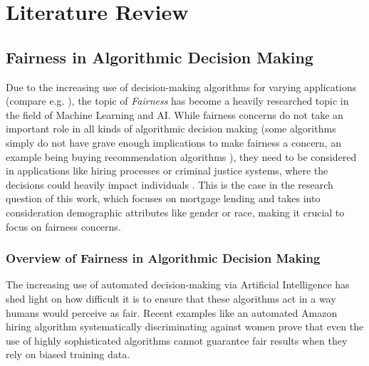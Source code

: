 \chapter{Literature Review}\label{chap:lit}

\section{Fairness in Algorithmic Decision Making}\label{sec:fairness}

Due to the increasing use of decision-making algorithms for varying applications (compare e.g. \cite{Mehrabi2021}), the topic of \textit{Fairness} has become a heavily researched topic in the field of Machine Learning and AI.\@
While fairness concerns do not take an important role in all kinds of algorithmic decision making (some algorithms simply do not have grave enough implications to make fairness a concern, an example being buying recommendation algorithms \parencite{Marcinkevics2023}), 
they need to be considered in applications like hiring processes or criminal justice systems, where the decisions could heavily impact individuals \parencite{Barocas2016}.
This is the case in the research question of this work, which focuses on mortgage lending and takes into consideration demographic attributes like gender or race, making it crucial to focus on fairness concerns.

\subsection{Overview of Fairness in Algorithmic Decision Making}\label{subsec:overview}

The increasing use of automated decision-making via Artificial Intelligence has shed light on how difficult it is to ensure that these algorithms act in a way humans would perceive as fair. 
Recent examples like an automated Amazon hiring algorithm systematically discriminating against women \parencite{Chang2023} prove that even the use of highly sophisticated algorithms cannot guarantee fair results when they rely on biased training data.

